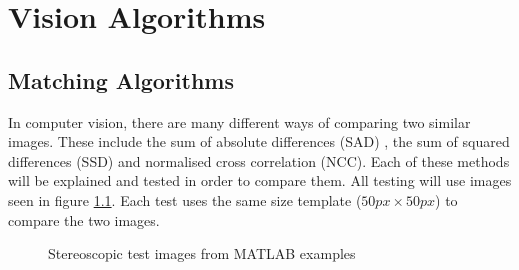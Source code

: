 \chapter{Vision Algorithms} \label{Chapter:InvestigationVision}

\section{Matching Algorithms}\label{Section:Comparison}
In computer vision, there are many different ways of comparing two similar images. These include the sum of absolute differences (SAD) \citep{Hamzah:DistanceDetection}, the sum of squared differences (SSD)\citep{Mrovlje:Distance_Stereoscopic} and  normalised cross correlation (NCC)\citep{zhao2006image}. Each of these methods will be explained and tested in order to compare them. All testing will use images seen in figure \ref{fig:StereoTest}. Each test uses the same size template ($50px\times50px$) to compare the two images. 

\begin{figure}
\centering
{}
\caption{Stereoscopic test images from MATLAB examples}
\label{fig:StereoTest}
\end{figure}


